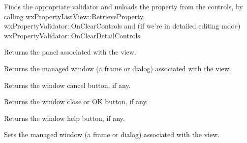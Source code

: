 \label{wxpropertylistviewendshowingproperty}


Finds the appropriate validator and unloads the property from the controls, by calling
wxPropertyListView::RetrieveProperty, wxPropertyValidator::OnClearControls and (if we're in
detailed editing mdoe) wxPropertyValidator::OnClearDetailControls.

\label{wxpropertylistviewgetpanel}


Returns the panel associated with the view.

\label{wxpropertylistviewgetmanagedwindow}


Returns the managed window (a frame or dialog) associated with the view.

\label{wxpropertylistviewgetwindowcancelbutton}


Returns the window cancel button, if any.

\label{wxpropertylistviewgetwindowclosebutton}


Returns the window close or OK button, if any.

\label{wxpropertylistviewgetwindowhelpbutton}


Returns the window help button, if any.

\label{wxpropertylistviewsetmanagedwindow}


Sets the managed window (a frame or dialog) associated with the view.

\label{wxpropertylistviewupdatepropdisplay}


